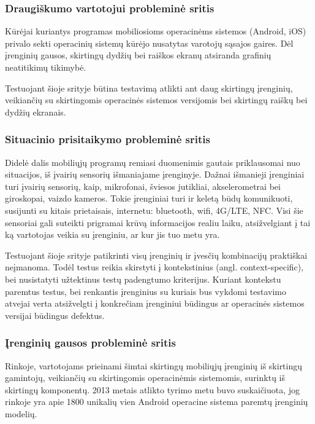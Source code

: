 \documentclass{VUMIFPSkursinis}
\begin{document}
\subsubsection{Draugiškumo vartotojui probleminė sritis}
Kūrėjai kuriantys programas mobiliosioms operacinėms sistemos (Android, iOS) privalo sekti operacinių sistemų kūrėjo nusatytas varotojų sąsajos gaires. Dėl įrenginių gausos, skirtingų dydžių bei raiškos ekranų atsiranda grafinių neatitikimų tikimybė. 

Testuojant šioje srityje būtina testavimą atlikti ant daug skirtingų įrenginių, veikiančių su skirtingomis operacinės sistemos versijomis bei skirtingų raiškų bei dydžių ekranais.

\subsubsection{Situacinio prisitaikymo probleminė sritis}
Didelė dalis mobiliųjų programų remiasi duomenimis gautais priklausomai nuo situacijos, iš įvairių sensorių išmaniajame įrenginyje. Dažnai išmanieji įrenginiai turi įvairių sensorių, kaip, mikrofonai, šviesos jutikliai, akselerometrai bei giroskopai, vaizdo kameros. Tokie įrenginiai turi ir keletą būdų komunikuoti, susijunti su kitais prietaisais, internetu: bluetooth, wifi, 4G/LTE, NFC. Visi šie sensoriai gali suteikti prigramai krūvą informacijos realiu laiku, atsižvelgiant į tai ką vartotojas veikia su įrenginiu, ar kur jis tuo metu yra.

Testuojant šioje srityje patikrinti visų įrenginių ir įvesčių kombinacijų praktiškai neįmanoma. Todėl testus reikia skirstyti į kontekstinius (angl. context-specific), bei nusistatyti užtektinus testų padengtumo kriterijus. Kuriant kontekstu paremtus testus, bei renkantis įrenginius su kuriais bus vykdomi testavimo atvejai verta atsižvelgti į konkrečiam įrenginiui būdingus ar operacinės sistemos versijai būdingus defektus. \cite{android_bugs}

\subsubsection{Įrenginių gausos probleminė sritis}
Rinkoje, vartotojams prieinami šimtai skirtingų mobiliųjų įrenginių iš skirtingų gamintojų, veikiančių su skirtingomis operacinėmis sistemomis, surinktų iš skirtingų komponentų. 2013 metais atlikto tyrimo metu buvo suskaičiuota, jog rinkoje yra apie 1800 unikalių vien Android operacine sistema paremtų įrenginių modelių. \cite{Muccini:2012:STM:2663608.2663615}
\end{document}
